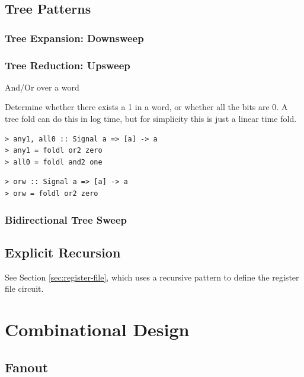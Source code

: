 \documentclass[a4paper,openany,fleqn]{book}
\begin{document}
\section{Tree Patterns}
\label{sec:tree-patterns}

\subsection{Tree Expansion: Downsweep}
\label{sec:tree-expansion}

\subsection{Tree Reduction: Upsweep}
\label{sec:tree-reduction}

And/Or over a word

Determine whether there exists a 1 in a word, or whether all the
bits are 0.  A tree fold can do this in log time, but for
simplicity this is just a linear time fold.

\begin{verbatim}
> any1, all0 :: Signal a => [a] -> a
> any1 = foldl or2 zero
> all0 = foldl and2 one
\end{verbatim}

\begin{verbatim}
> orw :: Signal a => [a] -> a
> orw = foldl or2 zero
\end{verbatim}

\subsection{Bidirectional Tree Sweep}
\label{sec:bidir-tree-sweep}

\section{Explicit Recursion}
\label{sec:explicit-recursion}


See Section \ref{sec:register-file}, which uses a recursive pattern to
define the register file circuit.

\chapter{Combinational Design}
\label{sec:combinational-design}

\section{Fanout}
\label{sec:fanout}
\end{document}
